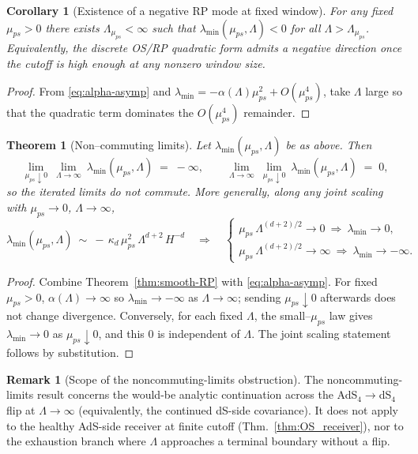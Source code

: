 \documentclass[10pt]{article}
\theoremstyle{definition}
\newtheorem{remark}{Remark}[section]
\theoremstyle{plain}
\newtheorem{theorem}{Theorem}[section]
\newtheorem{corollary}{Corollary}[section]
\begin{document}
\begin{corollary}[Existence of a negative RP mode at fixed window]\label{cor:neg-mode}
For any fixed \(\mu_{ps}>0\) there exists \(\Lambda_{\mu_{ps}}<\infty\) such that
\(\lambda_{\min}(\mu_{ps},\Lambda)<0\) for all \(\Lambda>\Lambda_{\mu_{ps}}\).
Equivalently, the discrete OS/RP quadratic form admits a negative direction once the cutoff is high enough at any nonzero window size.
\end{corollary}

\begin{proof}
From \eqref{eq:alpha-asymp} and \(\lambda_{\min}=-\alpha(\Lambda)\mu_{ps}^2+O(\mu_{ps}^4)\), take \(\Lambda\) large so that the quadratic term dominates the \(O(\mu_{ps}^4)\) remainder.
\end{proof}

\begin{theorem}[Non–commuting limits]\label{thm:noncommute}
Let \(\lambda_{\min}(\mu_{ps},\Lambda)\) be as above. Then
\[
\lim_{\mu_{ps}\downarrow 0}\ \lim_{\Lambda\to\infty}\ \lambda_{\min}(\mu_{ps},\Lambda)
\;=\; -\infty,
\qquad
\lim_{\Lambda\to\infty}\ \lim_{\mu_{ps}\downarrow 0}\ \lambda_{\min}(\mu_{ps},\Lambda)
\;=\; 0,
\]
so the iterated limits do not commute. More generally, along any joint scaling with \(\mu_{ps}\to0\), \(\Lambda\to\infty\),
\[
\lambda_{\min}(\mu_{ps},\Lambda)\ \sim\ -\,\kappa_{d}\,\mu_{ps}^2\,\Lambda^{d+2}\,H^{-d}
\quad\Rightarrow\quad
\begin{cases}
\mu_{ps}\,\Lambda^{(d+2)/2}\to 0 \ \Rightarrow\ \lambda_{\min}\to 0,\\
\mu_{ps}\,\Lambda^{(d+2)/2}\to \infty \ \Rightarrow\ \lambda_{\min}\to -\infty.
\end{cases}
\]
\end{theorem}

\begin{proof}
Combine Theorem~\ref{thm:smooth-RP} with \eqref{eq:alpha-asymp}. For fixed \(\mu_{ps}>0\), \(\alpha(\Lambda)\to\infty\) so \(\lambda_{\min}\to -\infty\) as \(\Lambda\to\infty\); sending \(\mu_{ps}\downarrow0\) afterwards does not change divergence. Conversely, for each fixed \(\Lambda\), the small–\(\mu_{ps}\) law gives \(\lambda_{\min}\to 0\) as \(\mu_{ps}\downarrow0\), and this \(0\) is independent of \(\Lambda\).
The joint scaling statement follows by substitution.
\end{proof}

\begin{remark}[Scope of the noncommuting-limits obstruction]
\label{rem:uom-main-012}
The noncommuting-limits result concerns the would-be analytic continuation across the AdS$_4\to$dS$_4$ flip at
$\Lambda\to\infty$ (equivalently, the continued dS-side covariance). It does not apply to the healthy AdS-side
receiver at finite cutoff (Thm.~\ref{thm:OS_receiver}), nor to the exhaustion branch where $\Lambda$ approaches a
terminal boundary without a flip.
\end{remark}
\end{document}
